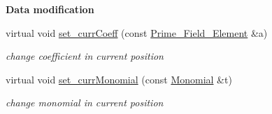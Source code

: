\begin{Indent}\textbf{ Data modification}\par
\begin{DoxyCompactItemize}
\item 
\mbox{\label{class_geobucket___iterator_a473e1b52ca92a5534d1138f1387119d8}} 
virtual void \hyperlink{class_geobucket___iterator_a473e1b52ca92a5534d1138f1387119d8}{set\+\_\+curr\+Coeff} (const \hyperlink{class_prime___field___element}{Prime\+\_\+\+Field\+\_\+\+Element} \&a)
\begin{DoxyCompactList}\small\item\em change coefficient in current position \end{DoxyCompactList}\item 
\mbox{\label{class_geobucket___iterator_a54ec0fb6493ec4b703fda8433c0f6937}} 
virtual void \hyperlink{class_geobucket___iterator_a54ec0fb6493ec4b703fda8433c0f6937}{set\+\_\+curr\+Monomial} (const \hyperlink{class_monomial}{Monomial} \&t)
\begin{DoxyCompactList}\small\item\em change monomial in current position \end{DoxyCompactList}\end{DoxyCompactItemize}
\end{Indent}
